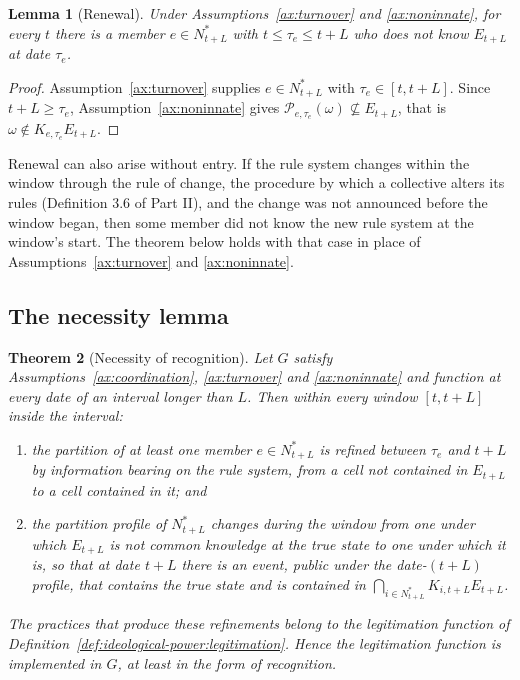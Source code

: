 \documentclass[11pt,letterpaper]{article}
\newtheorem{theorem}{Theorem}[section]
\newtheorem{lemma}[theorem]{Lemma}
\theoremstyle{definition}
\theoremstyle{remark}
\begin{document}
\begin{lemma}[Renewal]
\label{lem:ideological-power:renewal}
Under Assumptions~\ref{ax:turnover} and \ref{ax:noninnate}, for every $t$ there is a member $e\in N^\ast_{t+L}$ with $t\leq\tau_e\leq t+L$ who does not know $E_{t+L}$ at date $\tau_e$.
\end{lemma}

\begin{proof}
Assumption~\ref{ax:turnover} supplies $e\in N^\ast_{t+L}$ with $\tau_e\in[t,t+L]$. Since $t+L\geq\tau_e$, Assumption~\ref{ax:noninnate} gives $\mathcal{P}_{e,\tau_e}(\omega)\not\subseteq E_{t+L}$, that is $\omega\notin K_{e,\tau_e}E_{t+L}$.
\end{proof}

Renewal can also arise without entry. If the rule system changes within the window through the rule of change, the procedure by which a collective alters its rules (Definition 3.6 of Part II), and the change was not announced before the window began, then some member did not know the new rule system at the window's start. The theorem below holds with that case in place of Assumptions~\ref{ax:turnover} and \ref{ax:noninnate}.

\subsection{The necessity lemma}

\begin{theorem}[Necessity of recognition]
\label{thm:ideological-power:necessity}
Let $G$ satisfy Assumptions~\ref{ax:coordination}, \ref{ax:turnover} and \ref{ax:noninnate} and function at every date of an interval longer than $L$. Then within every window $[t,t+L]$ inside the interval:
\begin{enumerate}
\item[(i)] the partition of at least one member $e\in N^\ast_{t+L}$ is refined between $\tau_e$ and $t+L$ by information bearing on the rule system, from a cell not contained in $E_{t+L}$ to a cell contained in it; and
\item[(ii)] the partition profile of $N^\ast_{t+L}$ changes during the window from one under which $E_{t+L}$ is not common knowledge at the true state to one under which it is, so that at date $t+L$ there is an event, public under the date-$(t+L)$ profile, that contains the true state and is contained in $\bigcap_{i\in N^\ast_{t+L}}K_{i,t+L}E_{t+L}$.
\end{enumerate}
The practices that produce these refinements belong to the legitimation function of Definition~\ref{def:ideological-power:legitimation}. Hence the legitimation function is implemented in $G$, at least in the form of recognition.
\end{theorem}
\end{document}
